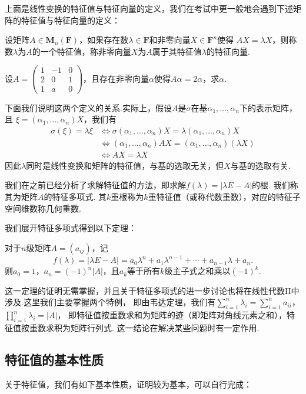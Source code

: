 上面是线性变换的特征值与特征向量的定义，我们在考试中更一般地会遇到下述矩阵的特征值与特征向量的定义：
\begin{definition}
    设矩阵$A\in \mathbf{M}_n(\mathbf{F})$，如果存在数$\lambda\in\mathbf{F}$和非零向量$X\in\mathbf{F}^n$使得
    $AX=\lambda X$，则称数$\lambda$为$A$的一个特征值，称非零向量$X$为$A$属于其特征值$\lambda$的特征向量.
\end{definition}
\begin{example}
    设$A=\begin{pmatrix}
        1 & -1 & 0 \\ 2 & 0 & 1 \\ 1 & a & 0
    \end{pmatrix}$，且存在非零向量$\alpha$使得$A\alpha=2\alpha$，求$\alpha$.
\end{example}
下面我们说明这两个定义的关系.实际上，假设$A$是$\sigma$在基$\alpha_1,\ldots,\alpha_n$下的表示矩阵，且
$\xi=(\alpha_1,\ldots,\alpha_n)X$，我们有
\begin{align*}
    \sigma(\xi)=\lambda\xi &\iff \sigma(\alpha_1,\ldots,\alpha_n)X=\lambda(\alpha_1,\ldots,\alpha_n)X \\
                           &\iff (\alpha_1,\ldots,\alpha_n)AX=(\alpha_1,\ldots,\alpha_n)(\lambda X) \\
                           &\iff AX=\lambda X
\end{align*}
因此$\lambda$同时是线性变换和矩阵的特征值，与基的选取无关，但$X$与基的选取有关.

我们在之前已经分析了求解特征值的方法，即求解$f(\lambda)=|\lambda E-A|$的根. 我们称其为矩阵$A$的特征多项式.
其$k$重根称为$k$重特征值（或称代数重数），对应的特征子空间维数称几何重数.

我们展开特征多项式得到以下定理：
\begin{theorem}
    对于$n$级矩阵$A=(a_{ij})$，记
    \[f(\lambda)=|\lambda E-A|=a_0\lambda^n+a_1\lambda^{n-1}+\cdots+a_{n-1}\lambda+a_n.\]
    则$a_0=1$，$a_n=(-1)^n|A|$，且$a_k$等于所有$k$级主子式之和乘以$(-1)^k$.
\end{theorem}
这一定理的证明无需掌握，并且关于特征多项式的进一步讨论也将在线性代数II中涉及.这里我们主要掌握两个特例，
即由韦达定理，我们有$\displaystyle\sum_{i=1}^{n}\lambda_i=\displaystyle\sum_{i=1}^{n}a_{ii}$，
$\displaystyle\prod_{i=1}^{n}\lambda_i=|A|$，
即特征值按重数求和为矩阵的迹（即矩阵对角线元素之和），特征值按重数求积为矩阵行列式.
这一结论在解决某些问题时有一定作用.

\subsection{特征值的基本性质}
关于特征值，我们有如下基本性质，证明较为基本，可以自行完成：

